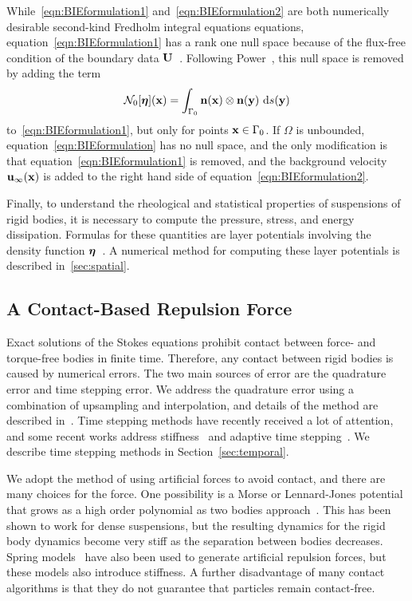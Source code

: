 \documentclass[AMA,STIX1COL]{WileyNJD-v2}
\begin{document}
While~\eqref{eqn:BIEformulation1} and~\eqref{eqn:BIEformulation2} are
both numerically desirable second-kind Fredholm integral equations
equations, equation~\eqref{eqn:BIEformulation1} has a rank one null
space because of the flux-free condition of the boundary data
${\mathbf{U}}$~\cite{Ladyzhenskaya1963}.  Following Power~\cite{Power1993}, this
null space is removed by adding the term 
\begin{align}
\label{eqn:N0_modification} 
  \mathcal{N}_0[{\boldsymbol\eta}]({\mathbf{x}}) = \int_{\Gamma_0} 
    {\mathbf{n}}({\mathbf{x}})\otimes{\mathbf{n}}({\mathbf{y}})~\text{d}s({\mathbf{y}})
\end{align}
to~\eqref{eqn:BIEformulation1}, but only for points ${\mathbf{x}} \in \Gamma_0$.
If $\Omega$ is unbounded, equation~\eqref{eqn:BIEformulation} has no
null space, and the only modification is that
equation~\eqref{eqn:BIEformulation1} is removed, and the background
velocity ${\mathbf{u}}_\infty({\mathbf{x}})$ is added to the right hand side of
equation~\eqref{eqn:BIEformulation2}.

Finally, to understand the rheological and statistical properties of
suspensions of rigid bodies, it is necessary to compute the pressure,
stress, and energy dissipation.  Formulas for these quantities are layer
potentials involving the density function ${\boldsymbol\eta}$~\cite{Power1993}.  A
numerical method for computing these layer potentials is described
in~\ref{sec:spatial}.


\subsection{A Contact-Based Repulsion Force}
\label{sec:repulsion}
Exact solutions of the Stokes equations prohibit contact between force-
and torque-free bodies in finite time.  Therefore, any contact between
rigid bodies is caused by numerical errors.  The two main sources of
error are the quadrature error and time stepping error.  We address the
quadrature error using a combination of upsampling and interpolation,
and details of the method are described in~\cite{Quaife2014}.  Time
stepping methods have recently received a lot of attention, and some
recent works address stiffness~\cite{Quaife2014} and adaptive time
stepping~\cite{Kropinski1999, Quaife2015, Sorgentone2018}.  We describe
time stepping methods in Section~\ref{sec:temporal}.

We adopt the method of using artificial forces to avoid contact, and
there are many choices for the force. One possibility is a Morse or
Lennard-Jones potential that grows as a high order polynomial as two
bodies approach~\cite{Flormann2017, Liu2006}. This has been shown to
work for dense suspensions, but the resulting dynamics for the rigid
body dynamics become very stiff as the separation between bodies
decreases.  Spring models~\cite{Tsubota2006, Kabacogulu2017} have also
been used to generate artificial repulsion forces, but these models also
introduce stiffness. A further disadvantage of many contact algorithms
is that they do not guarantee that particles remain contact-free.
\end{document}
